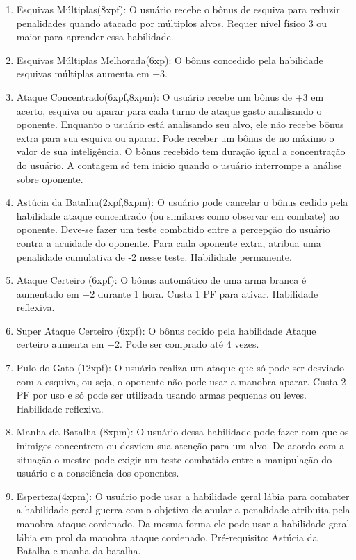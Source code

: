 \begin{enumerate}
	\item Esquivas Múltiplas(8xpf): O usuário recebe o bônus de esquiva para reduzir penalidades quando atacado por múltiplos alvos. Requer nível físico 3 ou maior para aprender essa habilidade.	

	\item Esquivas Múltiplas Melhorada(6xp): O bônus concedido pela habilidade esquivas múltiplas aumenta em +3. 
			
	\item Ataque Concentrado(6xpf,8xpm): O usuário recebe um bônus de +3 em acerto, esquiva ou aparar para cada turno de ataque gasto analisando o oponente. Enquanto o usuário está analisando seu alvo, ele não recebe bônus extra para sua esquiva ou aparar. Pode receber um bônus de no máximo o valor de sua inteligência. O bônus recebido tem duração igual a concentração do usuário. A contagem só tem inicio quando o usuário interrompe a análise sobre oponente.

	\item Astúcia da Batalha(2xpf,8xpm): O usuário pode cancelar o bônus cedido pela habilidade ataque concentrado (ou similares como observar em combate) ao oponente. Deve-se fazer um teste combatido entre a percepção do usuário contra a acuidade do oponente. Para cada oponente extra, atribua uma penalidade cumulativa de -2 nesse teste. Habilidade permanente.
	
	\item Ataque Certeiro (6xpf): O bônus automático de uma arma branca é aumentado em +2 durante 1 hora. Custa 1 PF para ativar. Habilidade reflexiva.
	
	\item Super Ataque Certeiro (6xpf): O bônus cedido pela habilidade Ataque certeiro aumenta em +2. Pode ser comprado até 4 vezes.
	
	\item Pulo do Gato (12xpf): O usuário realiza um ataque que só pode ser desviado com a esquiva, ou seja, o oponente não pode usar a manobra aparar. Custa 2 PF por uso e só pode ser utilizada usando armas pequenas ou leves. Habilidade reflexiva.
		
	\item Manha da Batalha (8xpm): O usuário dessa habilidade pode fazer com que os inimigos concentrem ou desviem sua atenção para um alvo. De acordo com a situação o mestre pode exigir um teste combatido entre a manipulação do usuário e a consciência dos oponentes.

	\item Esperteza(4xpm): O usuário pode usar a habilidade geral lábia para combater a habilidade geral guerra com o objetivo de anular a penalidade atribuita pela manobra ataque cordenado. Da mesma forma ele pode usar a habilidade geral lábia em prol da manobra ataque cordenado. Pré-requisito: Astúcia da Batalha e manha da batalha.
	

\end{enumerate}
